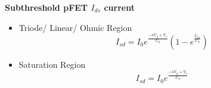 \textbf{Subthreshold pFET $I_{ds}$ current}
\begin{itemize}
    \item Triode/ Linear/ Ohmic Region
    \begin{equation}
        I_{sd} = I_0 e^{\frac{-\kappa V_g + V_s}{U_T}} (1 - e^{\frac{V_{ds}}{U_T}})
    \end{equation}
    \item Saturation Region
    \begin{equation}
        I_{sd} = I_0 e^{\frac{-\kappa V_g + V_s}{U_T}}
    \end{equation}
\end{itemize}